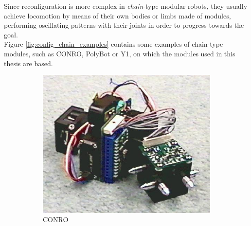 Since reconfiguration is more complex in \emph{chain}-type modular robots, they usually achieve locomotion by means of their own bodies or limbs made of modules, performing oscillating patterns with their joints in order to progress towards the goal.\\

Figure \ref{fig:config_chain_examples} contains some examples of chain-type modules, such as CONRO, PolyBot or Y1, on which the modules used in this thesis are based.\\

\begin{figure}[b]
		\centering
        \begin{subfigure}[b]{0.25\textwidth}
                \centering
                \includegraphics[width=\textwidth]{images/CONRO01.jpg}
                \caption{CONRO}
                \label{fig:conf_CONRO}
        \end{subfigure}
        ~
        \begin{subfigure}[b]{0.18\textwidth}
                \centering

\end{subfigure}
\end{figure}
